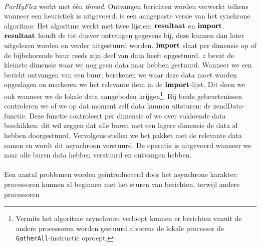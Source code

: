 \paragraph{}
\emph{ParHyFlex} werkt met \'e\'en \emph{thread}. Ontvangen berichten worden verwerkt telkens wanneer een heuristiek is uitgevoerd.  is een aangepaste versie van het synchrone algoritme. Het algoritme werkt met twee lijsten: $\mbox{\textbf{resultaat}}$ en $\mbox{\textbf{import}}$. $\mbox{\textbf{resultaat}}$ houdt de tot dusver ontvangen gegevens bij, deze kunnen dan later uitgelezen worden en verder uitgestuurd worden. $\mbox{\textbf{import}}$ slaat per dimensie op of de bijbehorende buur reeds zijn deel van data heeft opgestuurd. $z$ bevat de kleinste dimensie waar we nog geen data naar hebben gestuurd. Wanneer we een bericht ontvangen van een buur, berekenen we waar deze data moet worden opgeslagen en markeren we het relevante item in de $\mbox{\textbf{import}}$-lijst. Dit doen we ook wanneer we de lokale data aangeboden krijgen\footnote{Vermits het algoritme asynchroon verloopt kunnen er berichten vanuit de andere processoren worden gestuurd alvorens de lokale processor de \texttt{GatherAll}-instructie oproept.}. Bij beide gebeurtenissen controleren we of we op dat moment zelf data kunnen uitsturen: de \mbox{zendData}-functie. Deze functie controleert per dimensie of we over voldoende data beschikken: dit wil zeggen dat alle buren met een lagere dimensie de data al hebben doorgestuurd. Vervolgens stellen we het pakket met de relevante data samen en wordt dit asynchroon verstuurd. De operatie is uitgevoerd wanneer we naar alle buren data hebben verstuurd en ontvangen hebben.

\paragraph{}
Een aantal problemen worden ge\"introduceerd door het asynchrone karakter: processoren kunnen al beginnen met het sturen van berichten, terwijl andere processoren 


